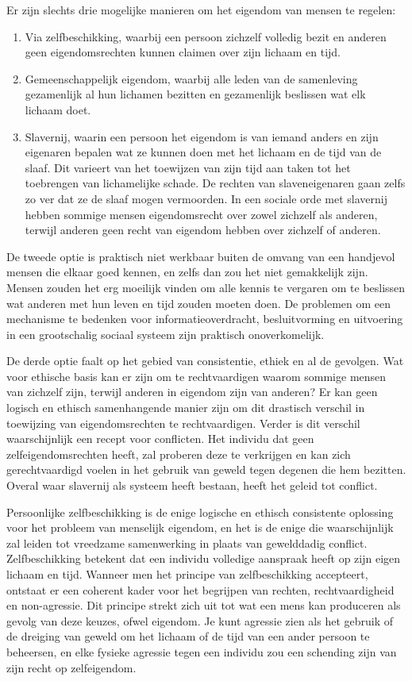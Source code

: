 Er zijn slechts drie mogelijke manieren om het eigendom van mensen te regelen:

\begin{enumerate}
\def\labelenumi{\arabic{enumi}.}
\item Via zelfbeschikking, waarbij een persoon zichzelf volledig bezit en anderen geen eigendomsrechten kunnen claimen over zijn lichaam en tijd.
\item Gemeenschappelijk eigendom, waarbij alle leden van de samenleving gezamenlijk al hun lichamen bezitten en gezamenlijk beslissen wat elk lichaam doet.
\item Slavernij, waarin een persoon het eigendom is van iemand anders en zijn eigenaren bepalen wat ze kunnen doen met het lichaam en de tijd van de slaaf. Dit varieert van het toewijzen van zijn tijd aan taken tot het toebrengen van lichamelijke schade. De rechten van slaveneigenaren gaan zelfs zo ver dat ze de slaaf mogen vermoorden. In een sociale orde met slavernij hebben sommige mensen eigendomsrecht over zowel zichzelf als anderen, terwijl anderen geen recht van eigendom hebben over zichzelf of anderen.
\end{enumerate}


De tweede optie is praktisch niet werkbaar buiten de omvang van een handjevol mensen die elkaar goed kennen, en zelfs dan zou het niet gemakkelijk zijn. Mensen zouden het erg moeilijk vinden om alle kennis te vergaren om te beslissen wat anderen met hun leven en tijd zouden moeten doen. De problemen om een mechanisme te bedenken voor informatieoverdracht, besluitvorming en uitvoering in een grootschalig sociaal systeem zijn praktisch onoverkomelijk.

De derde optie faalt op het gebied van consistentie, ethiek en al de gevolgen. Wat voor ethische basis kan er zijn om te rechtvaardigen waarom sommige mensen van zichzelf zijn, terwijl anderen in eigendom zijn van anderen? Er kan geen logisch en ethisch samenhangende manier zijn om dit drastisch verschil in toewijzing van eigendomsrechten te rechtvaardigen. Verder is dit verschil waarschijnlijk een recept voor conflicten. Het individu dat geen zelfeigendomsrechten heeft, zal proberen deze te verkrijgen en kan zich gerechtvaardigd voelen in het gebruik van geweld tegen degenen die hem bezitten. Overal waar slavernij als systeem heeft bestaan, heeft het geleid tot conflict.

Persoonlijke zelfbeschikking is de enige logische en ethisch consistente oplossing voor het probleem van menselijk eigendom, en het is de enige die waarschijnlijk zal leiden tot vreedzame samenwerking in plaats van gewelddadig conflict. Zelfbeschikking betekent dat een individu volledige aanspraak heeft op zijn eigen lichaam en tijd. Wanneer men het principe van zelfbeschikking accepteert, ontstaat er een coherent kader voor het begrijpen van rechten, rechtvaardigheid en non-agressie. Dit principe strekt zich uit tot wat een mens kan produceren als gevolg van deze keuzes, ofwel eigendom. Je kunt agressie zien als het gebruik of de dreiging van geweld om het lichaam of de tijd van een ander persoon te beheersen, en elke fysieke agressie tegen een individu zou een schending zijn van zijn recht op zelfeigendom.

